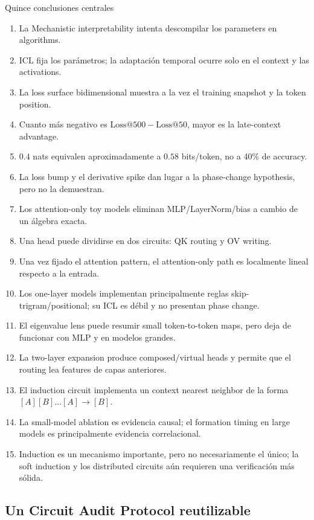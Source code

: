 \begin{importantbox}{Quince conclusiones centrales}
\begin{enumerate}
  \item La Mechanistic interpretability intenta descompilar los parameters en algorithms.
  \item ICL fija los parámetros; la adaptación temporal ocurre solo en el context y las activations.
  \item La loss surface bidimensional muestra a la vez el training snapshot y la token position.
  \item Cuanto más negativo es $\mathrm{Loss@500}-\mathrm{Loss@50}$, mayor es la late-context advantage.
  \item $0.4$ nats equivalen aproximadamente a $0.58$ bits/token, no a 40\% de accuracy.
  \item La loss bump y el derivative spike dan lugar a la phase-change hypothesis, pero no la demuestran.
  \item Los attention-only toy models eliminan MLP/LayerNorm/bias a cambio de un álgebra exacta.
  \item Una head puede dividirse en dos circuits: QK routing y OV writing.
  \item Una vez fijado el attention pattern, el attention-only path es localmente lineal respecto a la entrada.
  \item Los one-layer models implementan principalmente reglas skip-trigram/positional; su ICL es débil y no presentan phase change.
  \item El eigenvalue lens puede resumir small token-to-token maps, pero deja de funcionar con MLP y en modelos grandes.
  \item La two-layer expansion produce composed/virtual heads y permite que el routing lea features de capas anteriores.
  \item El induction circuit implementa un context nearest neighbor de la forma $[A][B]\ldots[A]\to[B]$.
  \item La small-model ablation es evidencia causal; el formation timing en large models es principalmente evidencia correlacional.
  \item Induction es un mecanismo importante, pero no necesariamente el único; la soft induction y los distributed circuits aún requieren una verificación más sólida.
\end{enumerate}
\end{importantbox}

\subsection{Un Circuit Audit Protocol reutilizable}

